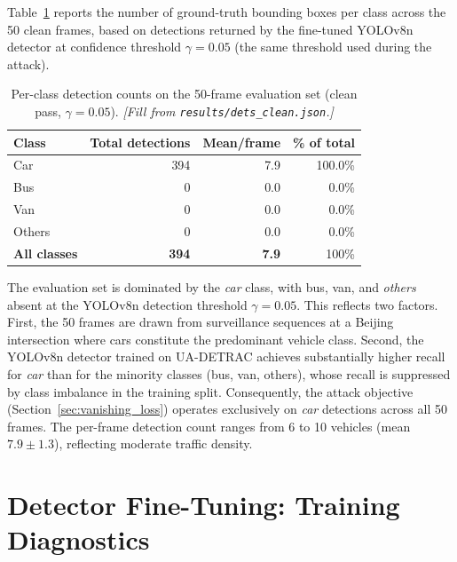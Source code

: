 \documentclass[12pt,a4paper]{report}
\begin{document}
Table~\ref{tab:eval_class_stats} reports the number of ground-truth
bounding boxes per class across the 50 clean frames, based on detections
returned by the fine-tuned YOLOv8n detector at confidence threshold
$\gamma = 0.05$ (the same threshold used during the attack).

\begin{table}[htbp]
  \centering
  \caption{Per-class detection counts on the 50-frame evaluation set
           (clean pass, $\gamma = 0.05$).  \textit{[Fill from
           \texttt{results/dets\_clean.json}.]}}
  \label{tab:eval_class_stats}
  \small
  \begin{tabular}{@{}lrrr@{}}
    \toprule
    Class & Total detections & Mean/frame & \% of total \\
    \midrule
    Car     & 394  & 7.9 & 100.0\% \\
    Bus     & 0    & 0.0 &   0.0\% \\
    Van     & 0    & 0.0 &   0.0\% \\
    Others  & 0    & 0.0 &   0.0\% \\
    \midrule
    \textbf{All classes} & \textbf{394} & \textbf{7.9} & 100\% \\
    \bottomrule
  \end{tabular}
\end{table}

The evaluation set is dominated by the \emph{car} class, with bus, van,
and \emph{others} absent at the YOLOv8n detection threshold
$\gamma = 0.05$.  This reflects two factors.  First, the 50 frames are
drawn from surveillance sequences at a Beijing intersection where cars
constitute the predominant vehicle class.  Second, the YOLOv8n detector
trained on UA-DETRAC achieves substantially higher recall for \emph{car}
than for the minority classes (bus, van, others), whose recall is
suppressed by class imbalance in the training split.  Consequently, the
attack objective (Section~\ref{sec:vanishing_loss}) operates exclusively on
\emph{car} detections across all 50 frames.  The per-frame detection
count ranges from 6 to 10 vehicles (mean $7.9 \pm 1.3$), reflecting
moderate traffic density.


\chapter{Detector Fine-Tuning: Training Diagnostics}
\label{app:detector_training}
\end{document}
